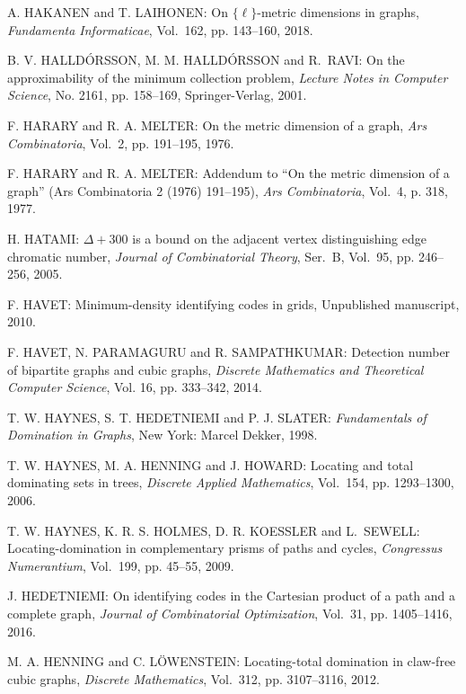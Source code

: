 \begin{thebibliography}{999}
A. HAKANEN and T. LAIHONEN: On $\{\ell\}$-metric dimensions in graphs, {\it Fundamenta Informaticae}, Vol.~162, pp. 143--160, 2018. 

B. V. HALLD\'ORSSON, M. M. HALLD\'ORSSON and R.~RAVI: On the approximability of the minimum collection problem, {\it Lecture Notes in Computer Science}, No. 2161, pp. 158--169, Springer-Verlag, 2001.

F. HARARY and R. A. MELTER: On the metric dimension of a graph, {\it Ars Combinatoria}, Vol.~2, pp. 191--195, 1976.

F. HARARY and R. A. MELTER: Addendum to ``On the metric dimension of a graph'' (Ars Combinatoria 2 (1976) 191--195), {\it Ars Combinatoria}, Vol.~4, p. 318, 1977.

H. HATAMI: $\Delta +300$ is a bound on the adjacent vertex distinguishing edge chromatic number, {\it Journal of Combinatorial Theory}, Ser.~B, Vol.~95, pp. 246--256, 2005.

F. HAVET: Minimum-density identifying codes in grids, Unpublished manuscript, 2010.

F. HAVET, N. PARAMAGURU and R. SAMPATHKUMAR: Detection number of bipartite graphs and cubic graphs, {\it Discrete Mathematics and Theoretical Computer Science}, Vol. 16, pp. 333--342, 2014.

T. W. HAYNES, S. T. HEDETNIEMI and P. J. SLATER: {\it Fundamentals of Domination in Graphs}, New York: Marcel Dekker, 1998.

T. W. HAYNES, M. A. HENNING and J. HOWARD: Locating and total dominating sets in trees, {\it Discrete Applied Mathematics}, Vol.~154, pp. 1293--1300, 2006.

T. W. HAYNES, K. R. S. HOLMES, D. R. KOESSLER and L.~SEWELL: Locating-domination in complementary prisms of paths and cycles, %
{\it Congressus Numerantium}, Vol.~199, pp. 45--55, 2009.

J. HEDETNIEMI: On identifying codes in the Cartesian product of a path and a complete graph, {\it Journal of Combinatorial Optimization}, Vol.~31, pp. 1405--1416, 2016.

M. A. HENNING and C. L\"{O}WENSTEIN: Locating-total domination in claw-free cubic graphs, {\it Discrete Mathematics}, Vol.~312, pp. 3107--3116, 2012. 


\end{thebibliography}
